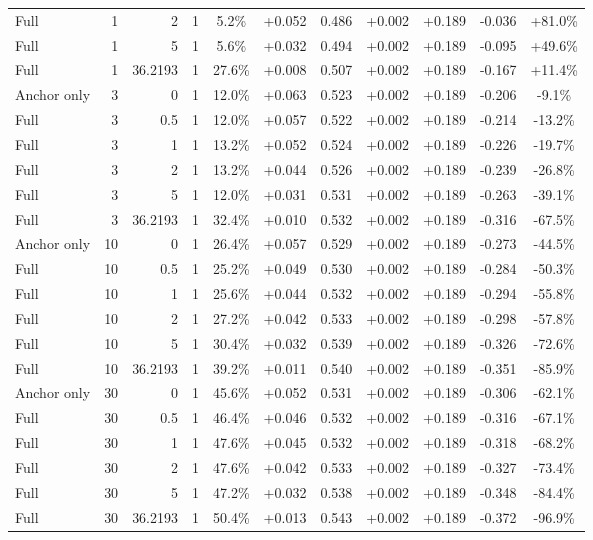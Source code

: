 \begin{table}[htbp]
\begin{tabular}{lrrrccccccc}
Full & 1 & 2 & 1 & 5.2\% & +0.052 & 0.486 & +0.002 & +0.189 & -0.036 & +81.0\% \\
Full & 1 & 5 & 1 & 5.6\% & +0.032 & 0.494 & +0.002 & +0.189 & -0.095 & +49.6\% \\
Full & 1 & 36.2193 & 1 & 27.6\% & +0.008 & 0.507 & +0.002 & +0.189 & -0.167 & +11.4\% \\
Anchor only & 3 & 0 & 1 & 12.0\% & +0.063 & 0.523 & +0.002 & +0.189 & -0.206 & -9.1\% \\
Full & 3 & 0.5 & 1 & 12.0\% & +0.057 & 0.522 & +0.002 & +0.189 & -0.214 & -13.2\% \\
Full & 3 & 1 & 1 & 13.2\% & +0.052 & 0.524 & +0.002 & +0.189 & -0.226 & -19.7\% \\
Full & 3 & 2 & 1 & 13.2\% & +0.044 & 0.526 & +0.002 & +0.189 & -0.239 & -26.8\% \\
Full & 3 & 5 & 1 & 12.0\% & +0.031 & 0.531 & +0.002 & +0.189 & -0.263 & -39.1\% \\
Full & 3 & 36.2193 & 1 & 32.4\% & +0.010 & 0.532 & +0.002 & +0.189 & -0.316 & -67.5\% \\
Anchor only & 10 & 0 & 1 & 26.4\% & +0.057 & 0.529 & +0.002 & +0.189 & -0.273 & -44.5\% \\
Full & 10 & 0.5 & 1 & 25.2\% & +0.049 & 0.530 & +0.002 & +0.189 & -0.284 & -50.3\% \\
Full & 10 & 1 & 1 & 25.6\% & +0.044 & 0.532 & +0.002 & +0.189 & -0.294 & -55.8\% \\
Full & 10 & 2 & 1 & 27.2\% & +0.042 & 0.533 & +0.002 & +0.189 & -0.298 & -57.8\% \\
Full & 10 & 5 & 1 & 30.4\% & +0.032 & 0.539 & +0.002 & +0.189 & -0.326 & -72.6\% \\
Full & 10 & 36.2193 & 1 & 39.2\% & +0.011 & 0.540 & +0.002 & +0.189 & -0.351 & -85.9\% \\
Anchor only & 30 & 0 & 1 & 45.6\% & +0.052 & 0.531 & +0.002 & +0.189 & -0.306 & -62.1\% \\
Full & 30 & 0.5 & 1 & 46.4\% & +0.046 & 0.532 & +0.002 & +0.189 & -0.316 & -67.1\% \\
Full & 30 & 1 & 1 & 47.6\% & +0.045 & 0.532 & +0.002 & +0.189 & -0.318 & -68.2\% \\
Full & 30 & 2 & 1 & 47.6\% & +0.042 & 0.533 & +0.002 & +0.189 & -0.327 & -73.4\% \\
Full & 30 & 5 & 1 & 47.2\% & +0.032 & 0.538 & +0.002 & +0.189 & -0.348 & -84.4\% \\
Full & 30 & 36.2193 & 1 & 50.4\% & +0.013 & 0.543 & +0.002 & +0.189 & -0.372 & -96.9\% \\

\end{tabular}
\end{table}
